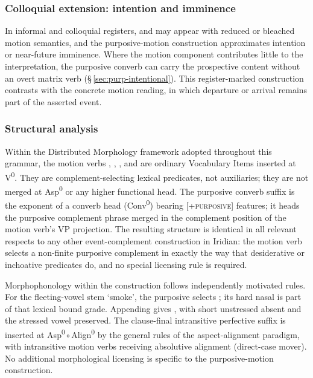 \subsubsection{Colloquial extension: intention and
imminence}\label{sec:purp-motion-colloquial}

In informal and colloquial registers,  and  may appear
with reduced or bleached motion semantics, and the purposive-motion construction
approximates intention or near-future imminence. Where the motion component
contributes little to the interpretation, the purposive converb can carry the
prospective content without an overt matrix verb
(§\,\ref{sec:purp-intentional}). This register-marked construction contrasts
with the concrete motion reading, in which departure or arrival remains part of
the asserted event.

\subsubsection{Structural analysis}\label{sec:purp-motion-structure}

Within the Distributed Morphology framework adopted throughout this grammar, the
motion verbs , , , and  are
ordinary Vocabulary Items inserted at V\textsuperscript{0}. They are
complement-selecting lexical predicates, not auxiliaries; they are not merged at
Asp\textsuperscript{0} or any higher functional head. The purposive converb
suffix  is the exponent of a converb head (Conv\textsuperscript{0})
bearing [\textsc{+purposive}] features; it heads the purposive complement phrase
merged in the complement position of the motion verb's VP projection. The
resulting structure is identical in all relevant respects to any other
event-complement construction in Iridian: the motion verb selects a non-finite
purposive complement in exactly the way that desiderative or inchoative
predicates do, and no special licensing rule is required.

Morphophonology within the construction follows independently motivated rules.
For the fleeting-vowel stem  `smoke', the purposive selects
; its hard nasal is part of that lexical bound grade. Appending
 gives , with short unstressed  absent and the
stressed vowel preserved. The clause-final intransitive perfective
suffix  is inserted at
Asp\textsuperscript{0}\,$\circ$\,Align\textsuperscript{0} by the general rules
of the aspect-alignment paradigm, with intransitive motion verbs receiving
absolutive alignment (direct-case mover). No additional morphological licensing
is specific to the purposive-motion construction.

